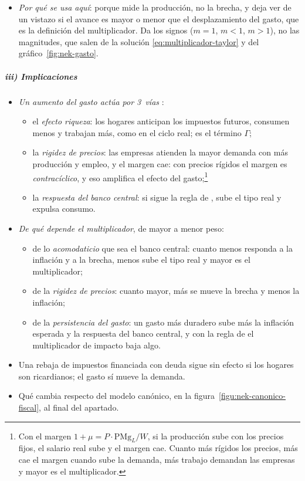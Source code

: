\documentclass[11pt]{article}
\begin{document}
\begin{anotaciones}
\begin{itemize}
\begin{itemize}
  \item \emph{en el panel b, la subida de la inflación esperada se supone}: en el modelo sale de la curva de  y de la duración del episodio (\ref{sec:multiplicador-limite} y anexo~\ref{anexo:derivacion-nek}).
  \end{itemize}
\item \emph{Por qué se usa aquí}: porque mide la producción, no la brecha, y deja ver de un vistazo si el avance es mayor o menor que el desplazamiento del gasto, que es la definición del multiplicador. Da los signos ($m=1$, $m<1$, $m>1$), no las magnitudes, que salen de la solución \eqref{eq:multiplicador-taylor} y del gráfico~\ref{fig:nek-gasto}.
\end{itemize}
\end{anotaciones}

\subparagraph{iii) Implicaciones}

\begin{itemize}
\item \emph{Un aumento del gasto actúa por 3~vías} :
  \begin{itemize}
  \item el \emph{efecto riqueza}: los hogares anticipan los impuestos futuros, consumen menos y trabajan más, como en el ciclo real; es el término $\Gamma$;
  \item la \emph{rigidez de precios}: las empresas atienden la mayor demanda con más producción y empleo, y el margen cae: con precios rígidos el margen es \emph{contracíclico}, y eso amplifica el efecto del gasto;\footnote{Con el margen $1+\mu=P\cdot\mathrm{PMg}_L/W$, si la producción sube con los precios fijos, el salario real sube y el margen cae. Cuanto más rígidos los precios, más cae el margen cuando sube la demanda, más trabajo demandan las empresas y mayor es el multiplicador.}
  \item la \emph{respuesta del banco central}: si sigue la regla de , sube el tipo real y expulsa consumo.
  \end{itemize}
\item \emph{De qué depende el multiplicador}, de mayor a menor peso:
  \begin{itemize}
  \item de lo \emph{acomodaticio} que sea el banco central: cuanto menos responda a la inflación y a la brecha, menos sube el tipo real y mayor es el multiplicador;
  \item de la \emph{rigidez de precios}: cuanto mayor, más se mueve la brecha y menos la inflación;
  \item de la \emph{persistencia del gasto}: un gasto más duradero sube más la inflación esperada y la respuesta del banco central, y con la regla de  el multiplicador de impacto baja algo.
  \end{itemize}
\item Una rebaja de impuestos financiada con deuda sigue sin efecto si los hogares son ricardianos; el gasto sí mueve la demanda.
\item Qué cambia respecto del modelo canónico, en la figura~\ref{figu:nek-canonico-fiscal}, al final del apartado.
\end{itemize}
\end{document}
